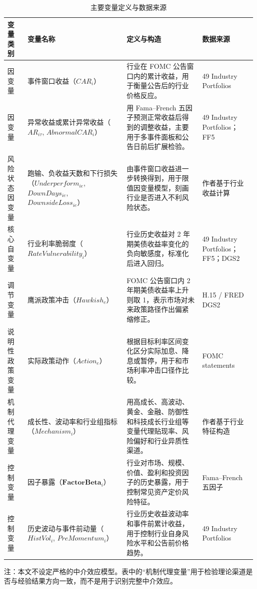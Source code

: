 \documentclass[UTF8,zihao=-4]{ctexart}
\begin{document}
\begin{table}[H]
\centering
\caption{主要变量定义与数据来源}
\begin{threeparttable}
\begin{tabularx}{\textwidth}{p{}p{}X p{}}
\toprule
变量类别 & 变量名称 & 定义与构造 & 数据来源 \\
\midrule
因变量 & 事件窗口收益（$CAR_i$） & 行业在 FOMC 公告窗口内的累计收益，用于衡量公告后的行业价格反应。 & 49 Industry Portfolios \\
因变量 & 异常收益或累计异常收益（$AR_{i\tau}$, $AbnormalCAR_i$） & 用 Fama--French 五因子预测正常收益后得到的调整收益，主要用于多事件面板和公告日前后扩展检验。 & 49 Industry Portfolios；FF5 \\
风险状态因变量 & 跑输、负收益天数和下行损失（$Underperform_{ie}$, $DownDays_{ie}$, $DownsideLoss_{ie}$） & 由事件窗口收益进一步转换得到，用于限值因变量模型，刻画行业是否进入不利风险状态。 & 作者基于行业收益计算 \\
核心自变量 & 行业利率脆弱度（$RateVulnerability_i$） & 行业历史收益对 2 年期美债收益率变化的负向敏感度，标准化后进入回归。 & 49 Industry Portfolios；FF5；DGS2 \\
调节变量 & 鹰派政策冲击（$Hawkish_e$） & FOMC 公告窗口内 2 年期美债收益率上升则取 1，表示市场对未来政策路径作出偏紧缩修正。 & H.15 / FRED DGS2 \\
说明性政策变量 & 实际政策动作（$Action_e$） & 根据目标利率区间变化区分实际加息、降息或暂停，用于和市场利率冲击口径作比较。 & FOMC statements \\
机制代理变量 & 成长性、波动率和行业组指标（$Mechanism_i$） & 用高成长、高波动、黄金、金融、防御性和科技成长行业组等变量代理贴现率、风险偏好和行业异质性渠道。 & 作者基于行业特征构造 \\
控制变量 & 因子暴露（$\mathbf{FactorBeta}_i$） & 行业对市场、规模、价值、盈利和投资因子的历史暴露，用于控制常见资产定价风险特征。 & Fama--French 五因子 \\
控制变量 & 历史波动与事件前动量（$HistVol_i$, $PreMomentum_i$） & 行业历史收益波动率和事件前累计收益，用于控制行业自身风险水平和公告前价格趋势。 & 49 Industry Portfolios \\
\bottomrule
\end{tabularx}
\begin{tablenotes}
\small
\item 注：本文不设定严格的中介效应模型。表中的“机制代理变量”用于检验理论渠道是否与经验结果方向一致，而不是用于识别完整中介效应。
\end{tablenotes}
\end{threeparttable}
\end{table}
\end{document}
